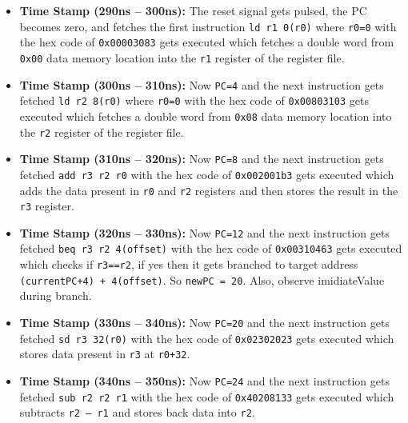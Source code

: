 \begin{itemize}
    \item \textbf{Time Stamp (290ns – 300ns):} The reset signal gets pulsed, the PC becomes zero, and fetches the first instruction \texttt{ld r1 0(r0)} where \texttt{r0=0} with the hex code of \texttt{0x00003083} gets executed which fetches a double word from \texttt{0x00} data memory location into the \texttt{r1} register of the register file.
    \item \textbf{Time Stamp (300ns – 310ns):} Now \texttt{PC=4} and the next instruction gets fetched \texttt{ld r2 8(r0)} where \texttt{r0=0} with the hex code of \texttt{0x00803103} gets executed which fetches a double word from \texttt{0x08} data memory location into the \texttt{r2} register of the register file.
    \item \textbf{Time Stamp (310ns – 320ns):} Now \texttt{PC=8} and the next instruction gets fetched \texttt{add r3 r2 r0} with the hex code of \texttt{0x002001b3} gets executed which adds the data present in \texttt{r0} and \texttt{r2} registers and then stores the result in the \texttt{r3} register.
    \item \textbf{Time Stamp (320ns – 330ns):} Now \texttt{PC=12} and the next instruction gets fetched \texttt{beq r3 r2 4(offset)} with the hex code of \texttt{0x00310463} gets executed which checks if \texttt{r3==r2}, if yes then it gets branched to target address \texttt{(currentPC+4) + 4(offset)}. So \texttt{newPC = 20}. Also, observe imidiateValue during branch.
    \item \textbf{Time Stamp (330ns – 340ns):} Now \texttt{PC=20} and the next instruction gets fetched \texttt{sd r3 32(r0)} with the hex code of \texttt{0x02302023} gets executed which stores data present in \texttt{r3} at \texttt{r0+32}.
    \item \textbf{Time Stamp (340ns – 350ns):} Now \texttt{PC=24} and the next instruction gets fetched \texttt{sub r2 r2 r1} with the hex code of \texttt{0x40208133} gets executed which subtracts \texttt{r2 – r1} and stores back data into \texttt{r2}.
\end{itemize}




